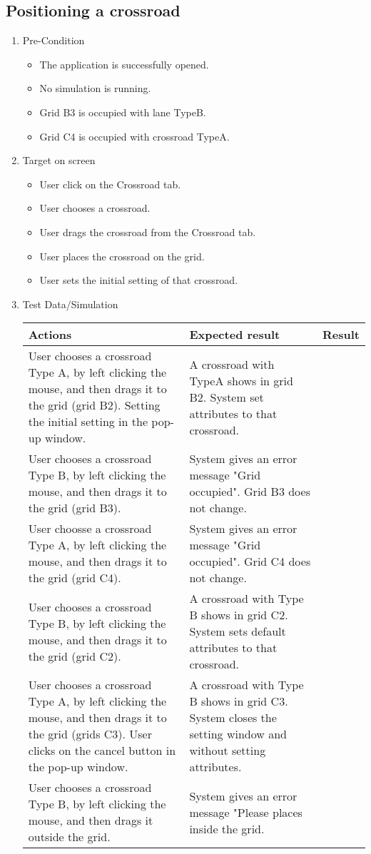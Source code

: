 \subsection{Positioning a crossroad}

\begin{enumerate}
	\item Pre-Condition
	\begin{itemize}
		\item The application is successfully opened.
		\item No simulation is running.
		\item Grid B3 is occupied with lane TypeB.
		\item Grid C4 is occupied with crossroad TypeA.
	\end{itemize}
	\item Target on screen
	\begin{itemize}
		\item User click on the Crossroad tab.
		\item User chooses a crossroad.
		\item User drags the crossroad from the Crossroad tab.
		\item User places the crossroad on the grid.
		\item User sets the initial setting of that crossroad.
	\end{itemize}
	\item Test Data/Simulation
	
	\begin{tabularx}{\textwidth}{|X|X|p{2.5cm}|}\hline
		Actions & Expected result & Result \\\hline
		User chooses a crossroad Type A, by left clicking the mouse, and then drags it to the grid (grid B2). Setting the initial setting in the pop-up window. & A crossroad with TypeA shows in grid B2. System set attributes to that crossroad. & \pass \\\hline
		User chooses a crossroad Type B, by left clicking the mouse, and then drags it to the grid (grid B3). & System gives an  error message "Grid occupied". Grid B3 does not change. & \pass\\\hline
		User choosse a crossroad Type A, by left clicking the mouse, and then drags it to the grid (grid C4). & System gives an  error message "Grid occupied". Grid C4 does not change. & \pass\\\hline
	    User chooses a crossroad Type B, by left clicking the mouse, and then drags it to the grid (grid C2). & A crossroad with Type B shows in grid C2. System sets default attributes to that crossroad. & \pass\\\hline
	    User chooses a crossroad Type A, by left clicking the mouse, and then drags it to the grid (grids C3). User clicks on the cancel button in the pop-up window. & A crossroad with Type B shows in grid C3. System closes the setting window and without setting attributes. & \pass\\\hline
	    User chooses a crossroad Type B, by left clicking the mouse, and then drags it outside the grid.& System gives an error message "Please places inside the grid. & \pass\\\hline
	     

\end{tabularx}
\end{enumerate}
